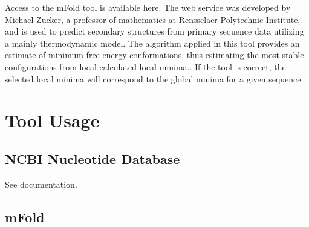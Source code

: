     Access to the mFold tool is available \href{http://unafold.rna.albany.edu/?q=mfold}{here}. The web service was developed by Michael Zucker, a professor of mathematics at Rensselaer Polytechnic Institute, and is used to predict secondary structures from primary sequence data utilizing a mainly thermodynamic model.\autocite{B19} The algorithm applied in this tool provides an estimate of minimum free energy conformations, thus estimating the most stable configurations from local calculated local minima.\autocite{B19}. If the tool is correct, the selected local minima will correspond to the global minima for a given sequence.\autocite{B19}

\section{Tool Usage}

    \subsection{NCBI Nucleotide Database}

    See documentation.\autocite{B18}
    
    \subsection{mFold}


